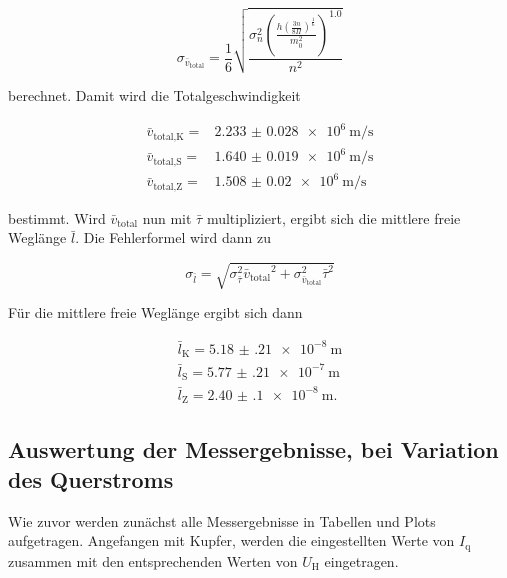 \begin{equation}
    \sigma _{\bar{v}_\text{total}} = \frac{1}{6}  \sqrt{\frac{\sigma_{n}^{2} \left(\frac{h \left(\frac{3 n}{8 \Pi}\right)^{\frac{1}{6}}}{m_{0}^{2}}\right)^{1.0}}{n^{2}}}
    \label{eq:totalgeschw._fehler}
\end{equation}

berechnet.
Damit wird die Totalgeschwindigkeit

\begin{align}
    \bar{v}_\text{total,K} =& \SI{2.233(28)e6}{\meter\per\second}\\
    \bar{v}_\text{total,S} =& \SI{1.640(19)e6}{\meter\per\second}\\
    \bar{v}_\text{total,Z} =& \SI{1.508(20)e6}{\meter\per\second}
    \label{eq:vtotal1}
\end{align}

bestimmt.
Wird $\bar{v}_\text{total}$ nun mit $\bar{\tau}$ multipliziert, ergibt sich die mittlere freie Weglänge $\bar{l}$.
Die Fehlerformel wird dann zu

\begin{equation}
    \sigma _{\bar{l}} = \sqrt{\sigma_{\bar{\tau}}^{2} {\bar{v}_\text{total}}^{2} + \sigma_{\bar{v}_\text{total}}^{2} {\bar{\tau}}^{2}}
    \label{eq:weglaenge_fehler}
\end{equation}

Für die mittlere freie Weglänge ergibt sich dann

\begin{align}
    \bar{l}_\text{K} = \SI{5.18(21)e-8}{\meter}\\
    \bar{l}_\text{S} = \SI{5.77(21)e-7}{\meter}\\
    \bar{l}_\text{Z} = \SI{2.40(10)e-8}{\meter}.
    \label{eq:weglaenge1}
\end{align}

\subsection{Auswertung der Messergebnisse, bei Variation des Querstroms}
\label{ssec:mess2}

Wie zuvor werden zunächst alle Messergebnisse in Tabellen und Plots aufgetragen.
Angefangen mit Kupfer, werden die eingestellten Werte von $I_\text{q}$ zusammen mit den entsprechenden Werten von $U_\text{H}$ eingetragen.

